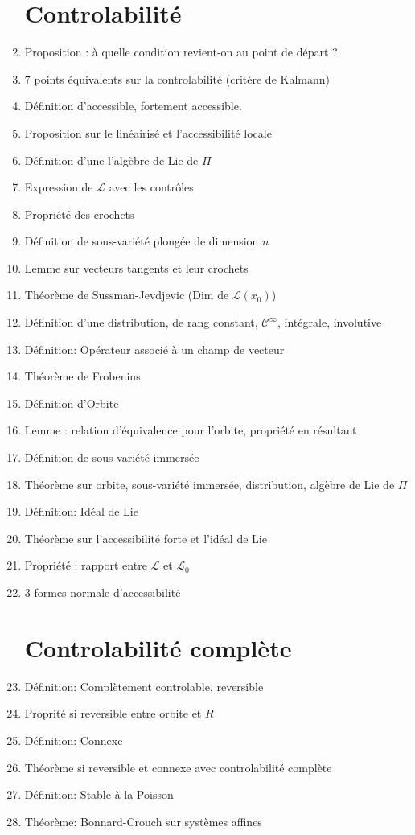 \documentclass{article}
\begin{document}
\begin{enumerate}
\section{Controlabilité}
	\item Proposition : à quelle condition revient-on au point de départ ?
	\item 7 points équivalents sur la controlabilité (critère de Kalmann)
	\item Définition d'accessible, fortement accessible.
	\item Proposition sur le linéairisé et l'accessibilité locale \item Définition d'une l'algèbre de Lie de $\Pi$
	\item Expression de $\mathcal{L}$ avec les contrôles
	\item Propriété des crochets
	\item Définition de sous-variété plongée de dimension $n$
	\item Lemme sur vecteurs tangents et leur crochets
	\item Théorème de Sussman-Jevdjevic (Dim de $\mathcal{L}(x_0)$)
	\item Définition d'une distribution, de rang constant, $\mathcal{C}^{\infty}$, intégrale, involutive
	\item Définition: Opérateur associé à un champ de vecteur
	\item Théorème de Frobenius
	\item Définition d'Orbite
	\item Lemme : relation d'équivalence pour l'orbite, propriété en résultant
	\item Définition de sous-variété immersée
	\item Théorème sur orbite, sous-variété immersée, distribution, algèbre de Lie de $\Pi$
	\item Définition: Idéal de Lie
	\item Théorème sur l'accessibilité forte et l'idéal de Lie
	\item Propriété : rapport entre $\mathcal{L}$ et $\mathcal{L}_0$
	\item 3 formes normale d'accessibilité
\section{Controlabilité complète}
	\item Définition: Complètement controlable, reversible
	\item Proprité si reversible entre orbite et $R$
	\item Définition: Connexe
	\item Théorème si reversible et connexe avec controlabilité complète
	\item Définition: Stable à la Poisson
	\item Théorème: Bonnard-Crouch sur systèmes affines
\end{enumerate}
\end{document}
